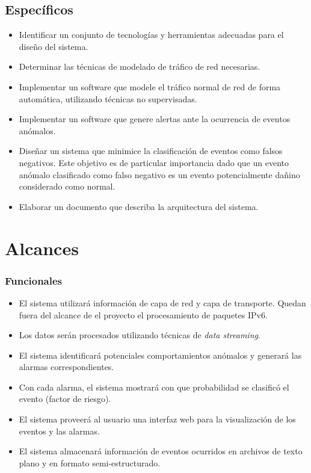 \subsection*{Específicos}
\begin{itemize}

\item Identificar un conjunto de tecnologías y herramientas adecuadas para el diseño del sistema.
\item Determinar las técnicas de modelado de tráfico de red necesarias.
\item Implementar un software que modele el tráfico normal de red de forma automática, utilizando técnicas no supervisadas.
\item Implementar un software que genere alertas ante la ocurrencia de eventos anómalos.
\item Diseñar un sistema que minimice la clasificación de eventos como falsos negativos. Este objetivo es de particular importancia dado que un evento anómalo clasificado como falso negativo es un evento potencialmente dañino considerado como normal.
\item Elaborar un documento que describa la arquitectura del sistema.
\end{itemize}

\section*{Alcances}

\subsubsection*{Funcionales}
\begin{itemize}
	\item El sistema utilizará información de capa de red\cite{rfc791} y capa de transporte\cite{rfc793}\cite{rfc1180}. Quedan fuera del alcance de el proyecto el procesamiento de paquetes IPv6.
	\item Los datos serán procesados utilizando técnicas de \textit{data streaming}\cite{Fischer:2012:RVA:2245276.2245432}.
	\item El sistema identificará potenciales comportamientos anómalos y generará las alarmas correspondientes.
	\item Con cada alarma, el sistema mostrará con que probabilidad se clasificó el evento (factor de riesgo).
	\item El sistema proveerá al usuario una interfaz web para la visualización de los eventos y las alarmas.
	\item El sistema almacenará información de eventos ocurridos en archivos de texto plano y en formato semi-estructurado.
\end{itemize}


